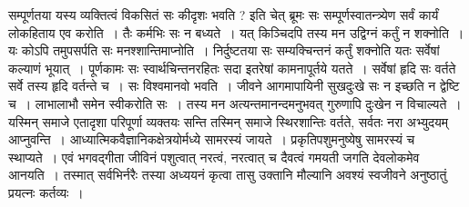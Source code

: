 {सम्पूर्णतया यस्य व्यक्तित्वं विकसितं सः कीदृशः भवति ? इति चेत् ब्रूमः सः सम्पूर्णस्वातन्त्र्येण सर्वं कार्यं लोकहिताय एव करोति~। तैः कर्मभिः सः न बध्यते~। यत् किञ्चिदपि तस्य मन उद्विग्नं कर्तुं न शक्नोति~। यः कोऽपि तमुपसर्पति सः मनश्शान्तिमाप्नोति~। निर्दुष्टतया सः सम्यक्चिन्तनं कर्तुं शक्नोति यतः सर्वेषां कल्याणं भूयात्~। पूर्णकामः सः स्वार्थचिन्तनरहितः सदा इतरेषां कामनापूर्तये यतते~। सर्वेषां हृदि सः वर्तते सर्वे तस्य हृदि वर्तन्ते च~। सः विश्वमानवो भवति~। जीवने आगमापायिनी सुखदुःखे सः न इच्छति न द्वेष्टि च~। लाभालाभौ समेन स्वीकरोति सः~। तस्य मन अत्यन्तमानन्दमनुभवत् गुरुणापि दुःखेन न विचाल्यते~। यस्मिन् समाजे एतादृशा परिपूर्णा व्यक्तयः सन्ति तस्मिन् समाजे स्थिरशान्तिः वर्तते, सर्वतः नरा अभ्युदयम् आप्नुवन्ति~। आध्यात्मिकवैज्ञानिकक्षेत्रयोर्मध्ये सामरस्यं जायते~। प्रकृतिपशुमनुष्येषु सामरस्यं च स्थाप्यते~। एवं भगवद्गीता जीविनं पशुत्वात् नरत्वं, नरत्वात् च दैवत्वं गमयती जगति देवलोकमेव आनयति~। तस्मात् सर्वभिर्नरैः तस्या अध्ययनं कृत्वा तासु उक्तानि मौल्यानि अवश्यं स्वजीवने अनुष्ठातुं प्रयत्नः कर्तव्यः~। 

\articleend
}
